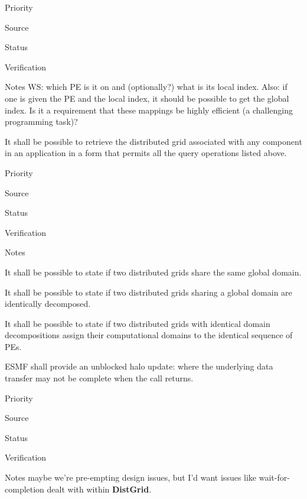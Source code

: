 \begin{reqlist}
\item[Priority]
\item[Source]
\item[Status]
\item[Verification]
\item[Notes] WS: which PE is it on and (optionally?) what 
is its local index.  Also: if one is given the PE and the local index, 
it should be possible to get the global index.  Is it a requirement that
these mappings be highly efficient (a challenging programming task)?
\end{reqlist}


It shall be possible to retrieve the distributed grid associated with
any component in an application in a form that permits all the query
operations listed above.

\begin{reqlist}
\item[Priority]
\item[Source]
\item[Status]
\item[Verification]
\item[Notes]
\end{reqlist}



It shall be possible to state if two distributed grids share the same
global domain.


It shall be possible to state if two distributed grids sharing a
global domain are identically decomposed.


It shall be possible to state if two distributed grids with identical
domain decompositions assign their computational domains to the
identical sequence of PEs.

 \label{DG:halo}


ESMF shall provide an unblocked halo update: where the underlying
data transfer may not be complete when the call returns.

\begin{reqlist}
\item[Priority]
\item[Source]
\item[Status]
\item[Verification]
\item[Notes] maybe we're pre-empting design issues, but I'd want
  issues like wait-for-completion dealt with within \textbf{DistGrid}.
\end{reqlist}

